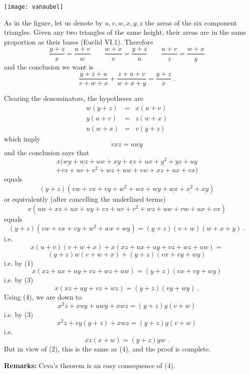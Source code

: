 \documentclass[12pt]{article}
\newcommand{\<}{\langle}
\renewcommand{\>}{\rangle}
\begin{document}
\texttt{[image: vanaubel]}

As in the figure, let us denote by $u,v,w,x,y,z$ the areas of the
six component triangles.
Given any two triangles of the same height, their areas are in the
same proportion as their bases (Euclid VI.1). Therefore
$$\frac{y+z}{x}=\frac{u+v}{w}
\qquad\frac{w+x}{v}=\frac{y+z}{u}
\qquad\frac{u+v}{z}=\frac{w+x}{y}$$
and the conclusion we want is
$$\frac{y+z+u}{v+w+x}+\frac{z+u+v}{w+x+y}=\frac{y+z}{x}\;.$$

Clearing the denominators, the hypotheses are
\begin{eqnarray}
w(y+z)&=&x(u+v) \\
y(u+v)&=&z(w+x) \\
u(w+x)&=&v(y+z)
\end{eqnarray}
which imply
\begin{equation}
vxz=uwy
\end{equation}
and the conclusion says that
$$x(\underline{wy}+\underline{wz}+uw
+\underline{xy}+\underline{xz}+ux+\underline{y^2}+\underline{yz}+uy$$
$$+vz+uv+v^2+wz+uw+vw+xz+ux+vx)$$
equals
$$(y+z)(vw+vx+vy+w^2+wx+wy+\underline{wx}+\underline{x^2}+\underline{xy})$$
or equivalently (after cancelling the underlined terms)
$$x(uw+xz+ux+uy+vz+uv+v^2+wz+uw+vw+ux+vx)$$
equals
$$(y+z)(vw+vx+vy+w^2+wx+wy)=(y+z)(v+w)(w+x+y)\;.$$
i.e.
$$x(u+v)(v+w+x)+x(xz+ux+uy+vz+wz+uw)=$$
$$(y+z)w(v+w+x)+(y+z)(vx+vy+wy)$$
i.e. by (1)
$$x(xz+ux+uy+vz+wz+uw)=(y+z)(vx+vy+wy)$$
i.e. by (3)
$$x(xz+uy+vz+wz)=(y+z)(vy+wy)\;.$$
Using (4), we are down to
$$x^2z+xuy+uwy+xwz=(y+z)y(v+w)$$
i.e. by (3)
$$x^2z+vy(y+z)+xwz=(y+z)y(v+w)$$
i.e.
$$xz(x+w)=(y+z)yw\;.$$
But in view of (2), this is the same as (4), and
the proof is complete.

\textbf{Remarks: }
Ceva's theorem is an easy consequence of (4).
\end{document}
